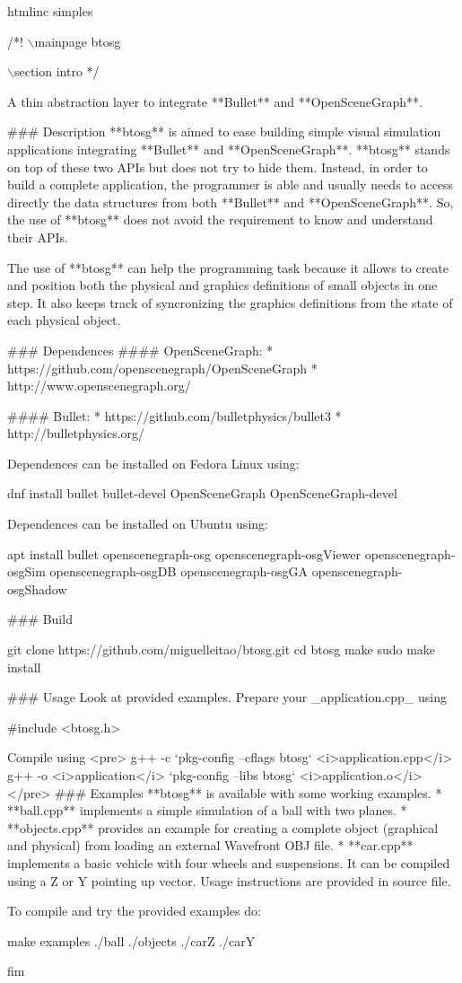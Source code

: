 htmlinc  simples 
\begin{DoxyCodeInclude}
/*!
\(\backslash\)mainpage btosg

\(\backslash\)section intro
*/

A thin abstraction layer to integrate **Bullet** and **OpenSceneGraph**.

### Description 
**btosg** is aimed to ease building simple visual simulation applications integrating **Bullet** and
       **OpenSceneGraph**.
**btosg** stands on top of these two APIs but does not try to hide them. 
Instead, in order to build a complete application, the programmer is able and usually needs to access
       directly the data structures from both **Bullet** and **OpenSceneGraph**. So, the use of **btosg** does not avoid
       the requirement to know and understand their APIs.

The use of **btosg** can help the programming task because it allows to create and position both the
       physical and graphics definitions of small objects in one step. It also keeps track of syncronizing the graphics
       definitions from the state of each physical object.

### Dependences
#### OpenSceneGraph: 
* https://github.com/openscenegraph/OpenSceneGraph 
* http://www.openscenegraph.org/

#### Bullet:
* https://github.com/bulletphysics/bullet3 
* http://bulletphysics.org/

Dependences can be installed on Fedora Linux using:

    dnf install bullet bullet-devel OpenSceneGraph OpenSceneGraph-devel

Dependences can be installed on Ubuntu using:

    apt install bullet openscenegraph-osg openscenegraph-osgViewer openscenegraph-osgSim
       openscenegraph-osgDB openscenegraph-osgGA openscenegraph-osgShadow

### Build

    git clone https://github.com/miguelleitao/btosg.git
    cd btosg
    make
    sudo make install

### Usage
Look at provided examples. Prepare your \_application.cpp\_ using

    #include <btosg.h>

Compile using
<pre>
g++ -c `pkg-config --cflags btosg` <i>application.cpp</i>
g++ -o <i>application</i> `pkg-config --libs btosg` <i>application.o</i>
</pre>
### Examples
**btosg** is available with some working examples.
* **ball.cpp** implements a simple simulation of a ball with two planes.
* **objects.cpp** provides an example for creating a complete object (graphical and physical) from loading
       an external Wavefront OBJ file. 
* **car.cpp** implements a basic vehicle with four wheels and suspensions. It can be compiled using a Z or
       Y pointing up vector.
Usage instructions are provided in source file.

To compile and try the provided examples do:

    make examples 
    ./ball
    ./objects
    ./carZ
    ./carY

\end{DoxyCodeInclude}
 fim 